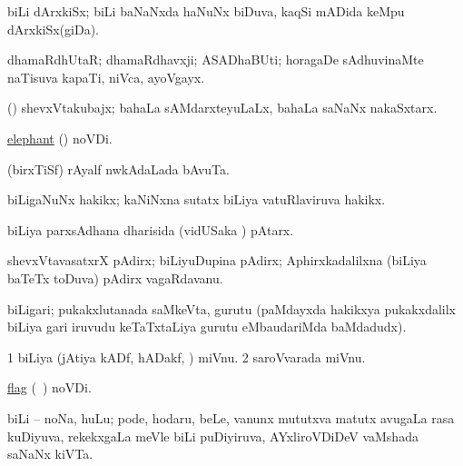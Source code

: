 \bentry
{}
\gl{\nA}
\bmng
biLi dArxkiSx; biLi baNaNxda haNuNx biDuva, kaqSi mADida keMpu dArxkiSx(giDa). 
\emng
\eentry

\bentry
{}
\gl{\nA}
\bmng
dhamaRdhUtaR; dhamaRdhavxji; ASADhaBUti; horagaDe sAdhuvinaMte naTisuva kapaTi, niVca, ayoVgayx. 
\emng
\eentry

\bentry
{}
\gl{\nA}
\bmng
(\Kavi) shevxVtakubajx; bahaLa sAMdarxteyuLaLx, bahaLa saNaNx nakaSxtarx. 
\emng
\eentry

\bentry
{}
\gl{\nA}
\bmng
\hyperref{kandict_e.pdf}{E}{elephant nuga(2)}{elephant} (\nuga{}) noVDi. 
\emng
\eentry

\bentry
{}
\gl{\nA}
\bmng
(birxTiSf) rAyalf nwkAdaLada bAvuTa. 
\emng
\eentry

\bentry
{}
\gl{\nA}
\bmng
biLigaNuNx hakikx; kaNiNxna sutatx biLiya vatuRlaviruva hakikx. 
\emng
\eentry

\bentry
{} 
\gl{\nA}
\expl{}
\bmng
biLiya parxsAdhana dharisida (vidUSaka \mo) pAtarx. 
\emng
\eentry

\bentry
{}
\gl{\nA}
\bmng
shevxVtavasatxrX pAdirx; biLiyuDupina pAdirx; Aphirxkadalilxna (biLiya baTeTx toDuva) pAdirx vagaRdavanu. 
\emng
\eentry

\bentry
{}
\gl{\nA}
\bmng
biLigari; pukakxlutanada saMkeVta, gurutu (paMdayxda hakikxya pukakxdalilx biLiya gari iruvudu keTaTxtaLiya gurutu eMbaudariMda baMdadudx). 
\emng
\eentry

\bentry 
{} 
\gl{\nA}
\bmng
\bnum
\num{1} biLiya (jAtiya kADf, hADakf, \mo) miVnu. 
\num{2} saroVvarada miVnu. 
\enum
\emng
\eentry

\bentry
{}
\gl{\nA}
\bmng
\hyperref{kandict_f.pdf}{F}{flag(5) pagu(6)}{flag} (\pagu\ ) noVDi. 
\emng
\eentry

\bentry
{} 
\gl{\nA}
\bmng
biLi -- noNa, huLu; pode, hodaru, beLe, \mo vanunx mututxva matutx avugaLa rasa kuDiyuva, rekekxgaLa meVle biLi puDiyiruva, AYxliroVDiDeV vaMshada saNaNx kiVTa. 
\emng
\eentry

